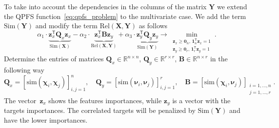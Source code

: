 \documentclass[12pt,oneside]{article}
\theoremstyle{definition}
\newcommand{\bz}{\mathbf{z}}
\newcommand{\bY}{\mathbf{Y}}
\newcommand{\bX}{\mathbf{X}}
\newcommand{\bB}{\mathbf{B}}
\newcommand{\bQ}{\mathbf{Q}}
\newcommand{\bbR}{\mathbb{R}}
\newcommand{\T}{\mathsf{T}}
\newcommand{\bchi}{\boldsymbol{\chi}}
\newcommand{\bnu}{\boldsymbol{\nu}}
\newcommand{\bOne}{\boldsymbol{1}}
\newcommand{\bZero}{\boldsymbol{0}}
\begin{document}
To take into account the dependencies in the columns of the matrix $\bY$ we extend the QPFS function~\eqref{eq:qpfs_problem} to the multivariate case.
We add the term~$\text{Sim}(\bY)$ and modify the term $\text{Rel}(\bX, \bY)$ as follows
\begin{equation}
	\alpha_1 \cdot \underbrace{\bz_x^{\T} \bQ_x \bz_x}_{\text{Sim}(\bX)} - \alpha_2 \cdot \underbrace{\bz_x^{\T} \bB \bz_y}_{\text{Rel}(\bX, \bY)} + \alpha_3 \cdot \underbrace{\bz_y^{\T} \bQ_y \bz_y}_{\text{Sim}(\bY)} \rightarrow \min_{\substack{\bz_x \geq \bZero_n, \, \bOne_n^{\T}\bz_x=1 \\ \bz_y \geq \bZero_r, \, \bOne_r^{\T}\bz_y=1}}.
	\label{eq:symimp}
\end{equation}
Determine the entries of matrices $\bQ_x \in \bbR^{n \times n}$, $\bQ_y \in \bbR^{r \times r}$, $\bB \in \bbR^{n \times r}$ in the following way
\begin{equation}
	\bQ_x = \left[ \text{sim}(\bchi_i, \bchi_j) \right]_{i,j=1}^n, \quad
	\bQ_y = \left[ \text{sim}(\bnu_i, \bnu_j) \right]_{i,j=1}^r, \quad
	\bB =  \left[ \text{sim}(\bchi_i, \bnu_j) \right]_{\substack{i=1, \dots, n \\ j=1, \dots, r}}.
\end{equation}
The vector~$\bz_x$ shows the features importances, while $\bz_y$ is a vector with the targets importances.
The correlated targets will be penalized by $\text{Sim} (\bY)$ and have the lower importances.
\end{document}
